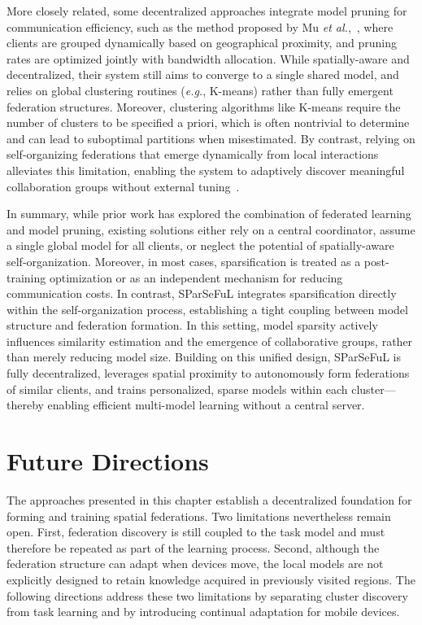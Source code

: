 More closely related, 
 some decentralized approaches integrate model pruning for communication efficiency, 
 such as the method proposed by Mu \textit{et al.},~\cite{mu2026tnse}, 
 where clients are grouped dynamically based on geographical proximity, 
 and pruning rates are optimized jointly with bandwidth allocation.
%
While spatially-aware and decentralized, 
 their system still aims to converge to a single shared model, 
 and relies on global clustering routines (\textit{e.g.}, K-means) rather than fully emergent federation structures.
%
Moreover, 
 clustering algorithms like K-means require the number of clusters to be specified a priori, 
 which is often nontrivial to determine and can lead to suboptimal partitions when misestimated. 
% 
By contrast, 
 relying on self-organizing federations that emerge dynamically 
 from local interactions alleviates this limitation, 
 enabling the system to adaptively discover meaningful collaboration groups 
 without external tuning~\cite{DBLP:journals/iot/DominiFAVE26}.

In summary, 
 while prior work has explored the combination of federated learning and model pruning, 
 existing solutions either rely on a central coordinator, 
 assume a single global model for all clients, 
 or neglect the potential of spatially-aware self-organization. 
% 
Moreover, 
 in most cases, 
 sparsification is treated as a post-training optimization 
 or as an independent mechanism for reducing communication costs.
%
In contrast, 
 SParSeFuL integrates sparsification directly within the self-organization process, 
 establishing a tight coupling between model structure and federation formation. 
%
In this setting, 
 model sparsity actively influences similarity estimation and the emergence of collaborative groups, 
 rather than merely reducing model size.
%
Building on this unified design, 
 SParSeFuL is fully decentralized, 
 leverages spatial proximity to autonomously form federations of similar clients, and trains personalized, 
 sparse models within each cluster—thereby enabling efficient multi-model learning without a central server.

\section{Future Directions}
\label{sec:selforgfl-future}

The approaches presented in this chapter establish a decentralized foundation 
 for forming and training spatial federations.
%
Two limitations nevertheless remain open.
%
First, 
 federation discovery is still coupled to the task model 
 and must therefore be repeated as part of the learning process.
%
Second, 
 although the federation structure can adapt when devices move, 
 the local models are not explicitly designed to retain knowledge acquired 
 in previously visited regions.
%
The following directions address these two limitations by separating cluster discovery 
 from task learning and by introducing continual adaptation for mobile devices.

